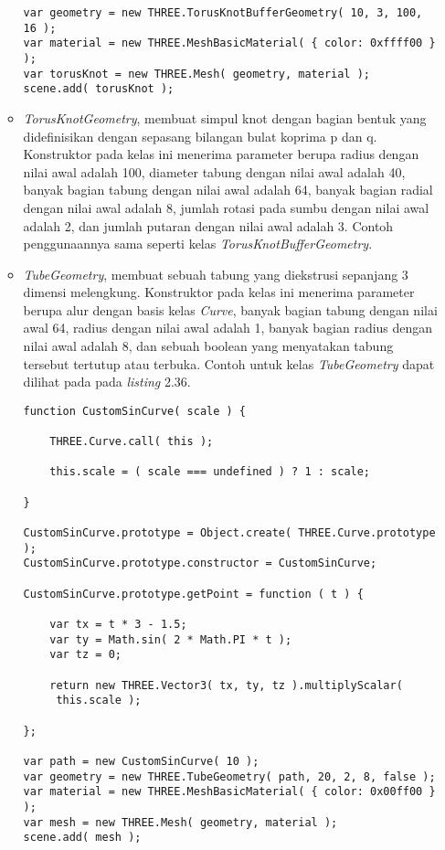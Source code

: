 \begin{itemize}
\begin{itemize}
\begin{lstlisting}[caption={Contoh penggunaan kelas {\it TorusKnotBufferGeometry}.},captionpos=b]
var geometry = new THREE.TorusKnotBufferGeometry( 10, 3, 100, 16 );
var material = new THREE.MeshBasicMaterial( { color: 0xffff00 } );
var torusKnot = new THREE.Mesh( geometry, material );
scene.add( torusKnot );
\end{lstlisting}

	\item {\it TorusKnotGeometry}, membuat simpul knot dengan bagian bentuk yang didefinisikan dengan sepasang bilangan bulat koprima p dan q. Konstruktor pada kelas ini menerima parameter berupa radius dengan nilai awal adalah 100, diameter tabung dengan nilai awal adalah 40, banyak bagian tabung dengan nilai awal adalah 64, banyak bagian radial dengan nilai awal adalah 8, jumlah rotasi pada sumbu dengan nilai awal adalah 2, dan jumlah putaran dengan nilai awal adalah 3.  Contoh penggunaannya sama seperti kelas {\it TorusKnotBufferGeometry}.
	
	\item {\it TubeGeometry}, membuat sebuah tabung yang diekstrusi sepanjang 3 dimensi melengkung. Konstruktor pada kelas ini menerima parameter berupa alur dengan basis kelas {\it Curve}, banyak bagian tabung dengan nilai awal 64, radius dengan nilai awal adalah 1, banyak bagian radius dengan nilai awal adalah 8, dan sebuah boolean yang menyatakan tabung tersebut tertutup atau terbuka. Contoh untuk kelas {\it TubeGeometry} dapat dilihat pada pada {\it listing} 2.36.
	
\begin{lstlisting}[caption={Contoh penggunaan kelas {\it TubeGeometry}.},captionpos=b]
function CustomSinCurve( scale ) {

	THREE.Curve.call( this );

	this.scale = ( scale === undefined ) ? 1 : scale;

}

CustomSinCurve.prototype = Object.create( THREE.Curve.prototype );
CustomSinCurve.prototype.constructor = CustomSinCurve;

CustomSinCurve.prototype.getPoint = function ( t ) {

	var tx = t * 3 - 1.5;
	var ty = Math.sin( 2 * Math.PI * t );
	var tz = 0;

	return new THREE.Vector3( tx, ty, tz ).multiplyScalar(
	 this.scale );

};

var path = new CustomSinCurve( 10 );
var geometry = new THREE.TubeGeometry( path, 20, 2, 8, false );
var material = new THREE.MeshBasicMaterial( { color: 0x00ff00 } );
var mesh = new THREE.Mesh( geometry, material );
scene.add( mesh );
\end{lstlisting}


\end{itemize}
\end{itemize}
